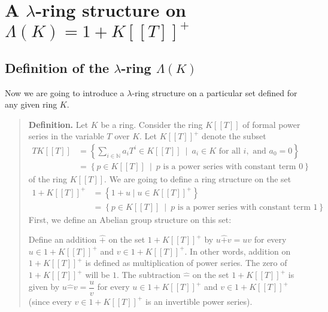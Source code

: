 \documentclass[numbers=enddot,12pt,final,onecolumn,notitlepage]{scrartcl}%
\begin{document}
\section{A $\lambda$-ring structure on $\Lambda\left(  K\right)  =1+K\left[
\left[  T\right]  \right]  ^{+}$}

\subsection{Definition of the $\lambda$-ring $\Lambda\left(  K\right)  $}

Now we are going to introduce a $\lambda$-ring structure on a particular set
defined for any given ring $K.$

\begin{quote}
\textbf{Definition.} Let $K$ be a ring. Consider the ring $K\left[  \left[
T\right]  \right]  $ of formal power series in the variable $T$ over $K$. Let
$K\left[  \left[  T\right]  \right]  ^{+}$ denote the subset%
\begin{align*}
TK\left[  \left[  T\right]  \right]   &  =\left\{  \sum_{i\in\mathbb{N}}%
a_{i}T^{i}\in K\left[  \left[  T\right]  \right]  \ \mid\ a_{i}\in K\text{ for
all }i,\text{ and }a_{0}=0\right\} \\
&  =\left\{  p\in K\left[  \left[  T\right]  \right]  \ \mid\ p\text{ is a
power series with constant term }0\right\}
\end{align*}
of the ring $K\left[  \left[  T\right]  \right]  $. We are going to define a
ring structure on the set
\begin{align*}
1+K\left[  \left[  T\right]  \right]  ^{+}  &  =\left\{  1+u\mid u\in K\left[
\left[  T\right]  \right]  ^{+}\right\} \\
&  =\left\{  p\in K\left[  \left[  T\right]  \right]  \ \mid\ p\text{ is a
power series with constant term }1\right\}  .
\end{align*}
First, we define an Abelian group structure on this set:

Define an addition $\widehat{+}$ on the set $1+K\left[  \left[  T\right]
\right]  ^{+}$ by $u\widehat{+}v=uv$ for every $u\in1+K\left[  \left[
T\right]  \right]  ^{+}$ and $v\in1+K\left[  \left[  T\right]  \right]  ^{+}$.
In other words, addition on $1+K\left[  \left[  T\right]  \right]  ^{+}$ is
defined as multiplication of power series. The zero of $1+K\left[  \left[
T\right]  \right]  ^{+}$ will be $1$. The subtraction $\widehat{-}$ on the set
$1+K\left[  \left[  T\right]  \right]  ^{+}$ is given by $u\widehat{-}%
v=\dfrac{u}{v}$ for every $u\in1+K\left[  \left[  T\right]  \right]  ^{+}$ and
$v\in1+K\left[  \left[  T\right]  \right]  ^{+}$ (since every $v\in1+K\left[
\left[  T\right]  \right]  ^{+}$ is an invertible power series).


\end{quote}
\end{document}
